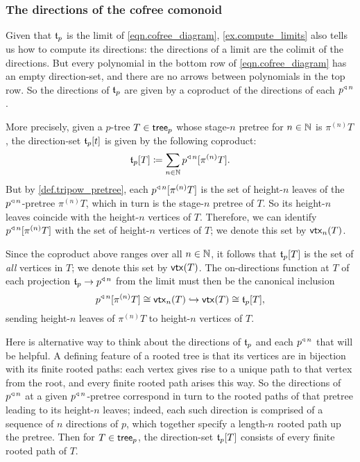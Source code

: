 \documentclass[Book-Poly]{subfiles}
\begin{document}
\subsubsection{The directions of the cofree comonoid}

Given that $\mathfrak{t}_p$ is the limit of \eqref{eqn.cofree_diagram}, \cref{ex.compute_limits} also tells us how to compute its directions: the directions of a limit are the colimit of the directions.
But every polynomial in the bottom row of \eqref{eqn.cofree_diagram} has an empty direction-set, and there are no arrows between polynomials in the top row.
So the directions of $\mathfrak{t}_p$ are given by a coproduct of the directions of each $p^{\mathbin{\triangleleft}\,n}$.

More precisely, given a $p$-tree $T\in\mathsf{tree}_p$ whose stage-$n$ pretree for $n\in\mathbb{N}$ is $\pi^{(n)}T$, the direction-set $\mathfrak{t}_p[t]$ is given by the following coproduct:
\[
    \mathfrak{t}_p[T]\coloneqq\sum_{n\in\mathbb{N}}p^{\mathbin{\triangleleft}\,n}[\pi^{(n)}T].
\]
But by \cref{def.tripow_pretree}, each $p^{\mathbin{\triangleleft}\,n}[\pi^{(n)}T]$ is the set of height-$n$ leaves of the $p^{\mathbin{\triangleleft}\,n}$-pretree $\pi^{(n)}T$, which in turn is the stage-$n$ pretree of $T$.
So its height-$n$ leaves coincide with the height-$n$ vertices of $T$.
Therefore, we can identify $p^{\mathbin{\triangleleft}\,n}[\pi^{(n)}T]$ with the set of height-$n$ vertices of $T$; we denote this set by $\mathsf{vtx}_n(T)$.

Since the coproduct above ranges over all $n\in\mathbb{N}$, it follows that $\mathfrak{t}_p[T]$ is the set of \emph{all} vertices in $T$; we denote this set by $\mathsf{vtx}(T)$.
The on-directions function at $T$ of each projection $\mathfrak{t}_p\to p^{\mathbin{\triangleleft}\,n}$ from the limit must then be the canonical inclusion
\[
    p^{\mathbin{\triangleleft}\,n}[\pi^{(n)}T]\cong \mathsf{vtx}_n(T)\hookrightarrow \mathsf{vtx}(T)\cong\mathfrak{t}_p[T],
\]
sending height-$n$ leaves of $\pi^{(n)}T$ to height-$n$ vertices of $T$.

Here is alternative way to think about the directions of $\mathfrak{t}_p$ and each $p^{\mathbin{\triangleleft}\,n}$ that will be helpful.
A defining feature of a rooted tree is that its vertices are in bijection with its finite rooted paths: each vertex gives rise to a unique path to that vertex from the root, and every finite rooted path arises this way.
So the directions of $p^{\mathbin{\triangleleft}\,n}$ at a given $p^{\mathbin{\triangleleft}\,n}$-pretree correspond in turn to the rooted paths of that pretree leading to its height-$n$ leaves; indeed, each such direction is comprised of a sequence of $n$ directions of $p$, which together specify a length-$n$ rooted path up the pretree.
Then for $T\in\mathsf{tree}_p$, the direction-set $\mathfrak{t}_p[T]$ consists of every finite rooted path of $T$. 
\end{document}
